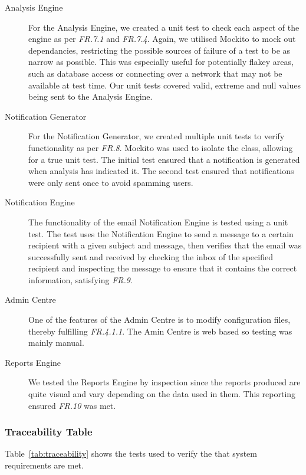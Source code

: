 \documentclass[10pt,a4paper]{article}
\begin{document}
\begin{description}
  \item[Analysis Engine] For the Analysis Engine, we created a unit test to check each aspect of the engine as per \emph{FR.7.1} and \emph{FR.7.4}. Again, we utilised Mockito to mock out dependancies, restricting the possible sources of failure of a test to be as narrow as possible. This was especially useful for potentially flakey areas, such as database access or connecting over a network that may not be available at test time. Our unit tests covered valid, extreme and null values being sent to the Analysis Engine.

  \item[Notification Generator] For the Notification Generator, we created multiple unit tests to verify functionality as per \emph{FR.8}. Mockito was used to isolate the class, allowing for a true unit test. The initial test ensured that a notification is generated when analysis has indicated it. The second test ensured that notifications were only sent once to avoid spamming users.	 

  \item[Notification Engine] The functionality of the email Notification Engine is tested using a unit test. The test uses the Notification Engine to send a message to a certain recipient with a given subject and message, then verifies that the email was successfully sent and received by checking the inbox of the specified recipient and inspecting the message to ensure that it contains the correct information, satisfying \emph{FR.9}.

  \item[Admin Centre] One of the features of the Admin Centre is to modify configuration files, thereby fulfilling \emph{FR.4.1.1}. The Amin Centre is web based so testing was mainly manual.

  \item[Reports Engine] We tested the Reports Engine by inspection since the reports produced are quite visual and vary depending on the data used in them. This reporting ensured \emph{FR.10} was met.

 \end{description}

\subsubsection{Traceability Table}

Table~\ref{tab:traceability} shows the tests used to verify the that system requirements are met.
\end{document}
